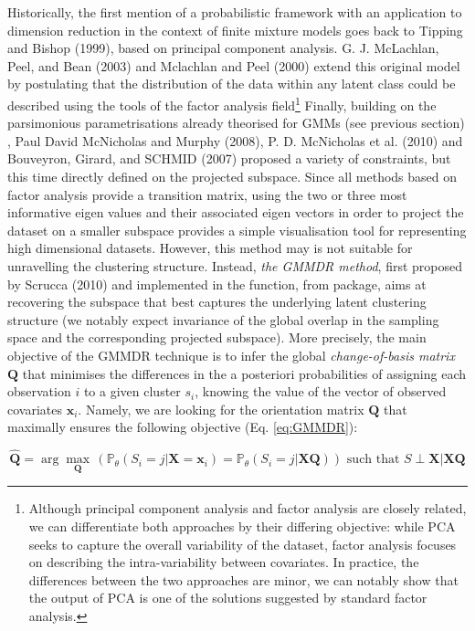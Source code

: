Historically, the first mention of a probabilistic framework with an application to dimension reduction in the context of finite mixture models goes back to Tipping and Bishop (1999), based on principal component analysis. G. J. McLachlan, Peel, and Bean (2003) and Mclachlan and Peel (2000) extend this original model by postulating that the distribution of the data within any latent class could be described using the tools of the factor analysis field\footnote{Although principal component analysis and factor analysis are closely related, we can differentiate both approaches by their differing objective: while PCA seeks to capture the overall variability of the dataset, factor analysis focuses on describing the intra-variability between covariates. In practice, the differences between the two approaches are minor, we can notably show that the output of PCA is one of the solutions suggested by standard factor analysis.} Finally, building on the parsimonious parametrisations already theorised for GMMs (see previous section) , Paul David McNicholas and Murphy (2008), P. D. McNicholas et al. (2010) and Bouveyron, Girard, and SCHMID (2007) proposed a variety of constraints, but this time directly defined on the projected subspace. Since all methods based on factor analysis provide a transition matrix, using the two or three most informative eigen values and their associated eigen vectors in order to project the dataset on a smaller subspace provides a simple visualisation tool for representing high dimensional datasets.
However, this method may is not suitable for unravelling the clustering structure. Instead, \emph{the GMMDR method}, first proposed by Scrucca (2010) and implemented in the  function, from  package, aims at recovering the subspace that best captures the underlying latent clustering structure (we notably expect invariance of the global overlap in the sampling space and the corresponding projected subspace). More precisely, the main objective of the GMMDR technique is to infer the global \emph{change-of-basis matrix} \(\boldsymbol{Q}\) that minimises the differences in the a posteriori probabilities of assigning each observation \(i\) to a given cluster \(s_i\), knowing the value of the vector of observed covariates \(\boldsymbol{x}_i\). Namely, we are looking for the orientation matrix \(\boldsymbol{Q}\) that maximally ensures the following objective (Eq. \eqref{eq:GMMDR}):

\begin{equation}
 \hat{\boldsymbol{Q}} = \arg \max_{\boldsymbol{Q}} \,  \left(\mathbb{P}_{\theta} (S_i=j | \boldsymbol{X} =\boldsymbol{x}_i) = \mathbb{P}_{\theta} (S_i=j | \boldsymbol{X} \boldsymbol{Q}) \right)
\text{ such that } S \perp \boldsymbol{X} | \boldsymbol{X} \boldsymbol{Q}
    \label{eq:GMMDR}
\end{equation}

